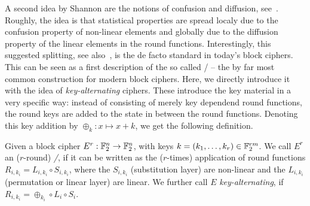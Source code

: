 A second idea by Shannon are the notions of confusion and diffusion, see~\cite[Section~35]{shannon45}.
Roughly, the idea is that statistical properties are spread localy due to the confusion property of non-linear elements and globally due to the diffusion property of the linear elements in the round functions.
Interestingly, this suggested splitting, see also~\cite[pp.~712f]{Shannon49}, is the de facto standard in today's block ciphers.
This can be seen as a first description of the so called \SPN/ -- the by far most common construction for modern block ciphers.
Here, we directly introduce it with the idea of \emph{key-alternating} ciphers.
These introduce the key material in a very specific way: instead of consisting of merely key dependend round functions, the round keys are added to the state in between the round functions.
Denoting this key addition by $\oplus_k : x \mapsto x + k$, we get the following definition.
\begin{definition}\label{def:spn}
    Given a block cipher $E^r : \mathbb{F}_2^n \to \mathbb{F}_2^n$, with keys $k = (k_1, \ldots, k_r) \in \mathbb{F}_2^{rm}$.
    We call $E^r$ an ($r$-round) \emph{\SPNf/}, if it can be written as the ($r$-times) application of round functions $R_{i, k_i} = L_{i,k_i} \circ S_{i,k_i}$, where the $S_{i,k_i}$ (substitution layer) are non-linear and the $L_{i,k_i}$ (permutation or linear layer) are linear.
    We further call $E$ \emph{key-alternating}, if $R_{i,k_i} = \oplus_{k_i} \circ L_i \circ S_i$.
\end{definition}
